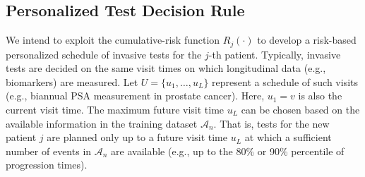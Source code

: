 \documentclass[useAMS, usenatbib, referee]{biom}
\begin{document}
\subsection{Personalized Test Decision Rule} 
\label{subsec:pers_schedule}
We intend to exploit the cumulative-risk function $R_j(\cdot)$ to develop a risk-based personalized schedule of invasive tests for the $j$-th patient. Typically, invasive tests are decided on the same visit times on which longitudinal data (e.g., biomarkers) are measured. Let $U = \{u_1, \ldots, u_L\}$ represent a schedule of such visits (e.g., biannual PSA measurement in prostate cancer).  Here, $u_1 = v$ is also the current visit time. The maximum future visit time $u_L$ can be chosen based on the available information in the training dataset $\mathcal A_n$. That is, tests for the new patient $j$ are planned only up to a future visit time $u_L$ at which a sufficient number of events in $\mathcal A_n$ are available (e.g., up to the 80\% or 90\% percentile of progression times).
\end{document}
